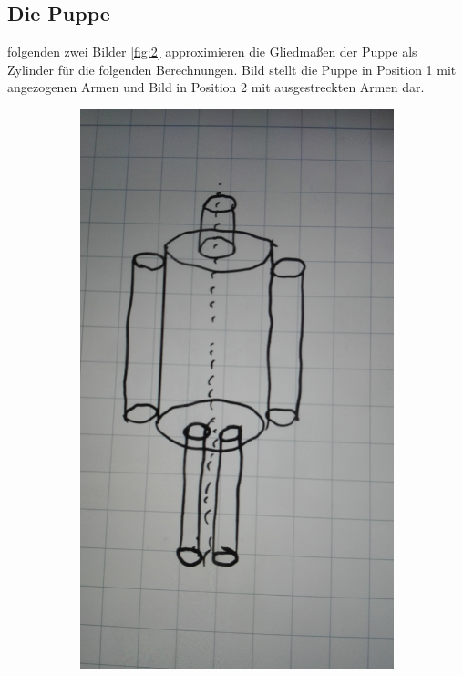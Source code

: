 \subsection{Die Puppe}\justifying %

\justifying folgenden zwei Bilder \ref{fig:2} approximieren die Gliedmaßen der Puppe als Zylinder für die folgenden 
Berechnungen. Bild  stellt die Puppe in Position 1 mit angezogenen Armen und Bild  in Position 2 mit 
ausgestreckten Armen dar.

\begin{figure}[H]
\caption{Positionen der Puppe}
\label{fig:2}
    \begin{subfigure}{0.495\linewidth}
        \centering
        \includegraphics[width=\textwidth]{images/puppe_an.jpg}

\end{subfigure}
\end{figure}
